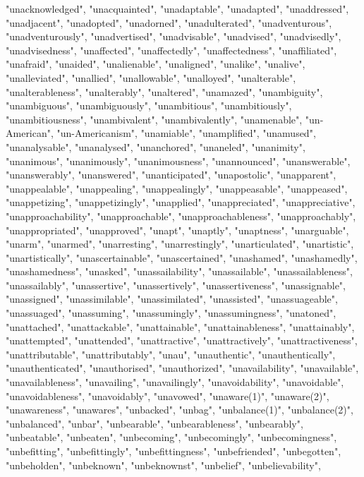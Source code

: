 "unacknowledged",
"unacquainted",
"unadaptable",
"unadapted",
"unaddressed",
"unadjacent",
"unadopted",
"unadorned",
"unadulterated",
"unadventurous",
"unadventurously",
"unadvertised",
"unadvisable",
"unadvised",
"unadvisedly",
"unadvisedness",
"unaffected",
"unaffectedly",
"unaffectedness",
"unaffiliated",
"unafraid",
"unaided",
"unalienable",
"unaligned",
"unalike",
"unalive",
"unalleviated",
"unallied",
"unallowable",
"unalloyed",
"unalterable",
"unalterableness",
"unalterably",
"unaltered",
"unamazed",
"unambiguity",
"unambiguous",
"unambiguously",
"unambitious",
"unambitiously",
"unambitiousness",
"unambivalent",
"unambivalently",
"unamenable",
"un-American",
"un-Americanism",
"unamiable",
"unamplified",
"unamused",
"unanalysable",
"unanalysed",
"unanchored",
"unaneled",
"unanimity",
"unanimous",
"unanimously",
"unanimousness",
"unannounced",
"unanswerable",
"unanswerably",
"unanswered",
"unanticipated",
"unapostolic",
"unapparent",
"unappealable",
"unappealing",
"unappealingly",
"unappeasable",
"unappeased",
"unappetizing",
"unappetizingly",
"unapplied",
"unappreciated",
"unappreciative",
"unapproachability",
"unapproachable",
"unapproachableness",
"unapproachably",
"unappropriated",
"unapproved",
"unapt",
"unaptly",
"unaptness",
"unarguable",
"unarm",
"unarmed",
"unarresting",
"unarrestingly",
"unarticulated",
"unartistic",
"unartistically",
"unascertainable",
"unascertained",
"unashamed",
"unashamedly",
"unashamedness",
"unasked",
"unassailability",
"unassailable",
"unassailableness",
"unassailably",
"unassertive",
"unassertively",
"unassertiveness",
"unassignable",
"unassigned",
"unassimilable",
"unassimilated",
"unassisted",
"unassuageable",
"unassuaged",
"unassuming",
"unassumingly",
"unassumingness",
"unatoned",
"unattached",
"unattackable",
"unattainable",
"unattainableness",
"unattainably",
"unattempted",
"unattended",
"unattractive",
"unattractively",
"unattractiveness",
"unattributable",
"unattributably",
"unau",
"unauthentic",
"unauthentically",
"unauthenticated",
"unauthorised",
"unauthorized",
"unavailability",
"unavailable",
"unavailableness",
"unavailing",
"unavailingly",
"unavoidability",
"unavoidable",
"unavoidableness",
"unavoidably",
"unavowed",
"unaware(1)",
"unaware(2)",
"unawareness",
"unawares",
"unbacked",
"unbag",
"unbalance(1)",
"unbalance(2)",
"unbalanced",
"unbar",
"unbearable",
"unbearableness",
"unbearably",
"unbeatable",
"unbeaten",
"unbecoming",
"unbecomingly",
"unbecomingness",
"unbefitting",
"unbefittingly",
"unbefittingness",
"unbefriended",
"unbegotten",
"unbeholden",
"unbeknown",
"unbeknownst",
"unbelief",
"unbelievability",
